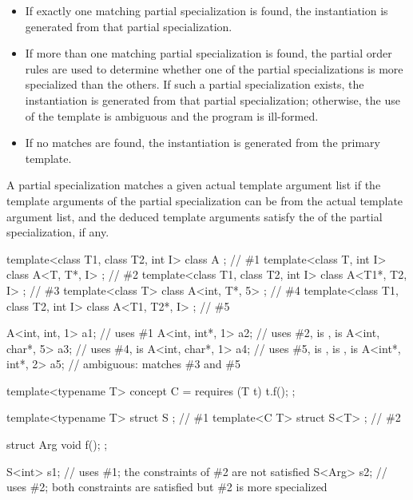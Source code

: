 \begin{itemize}
\item
If exactly one matching partial specialization is found, the instantiation is
generated from that partial specialization.
\item
If more than one matching partial specialization is found,
the partial order rules are used to determine
whether one of the partial specializations is more specialized than the
others.
If such a partial specialization exists,
the instantiation is generated from that partial specialization;
otherwise, the use of the template is ambiguous and the program is ill-formed.
\item
If no matches are found, the instantiation is generated from the
primary template.
\end{itemize}

\pnum
A partial specialization matches a given actual template argument
list if the template arguments of the partial specialization can be
 from the actual template argument list,
and the deduced template arguments satisfy the 
of the partial specialization, if any.
\begin{example}
\begin{codeblock}
template<class T1, class T2, int I> class A             { };    // \#1
template<class T, int I>            class A<T, T*, I>   { };    // \#2
template<class T1, class T2, int I> class A<T1*, T2, I> { };    // \#3
template<class T>                   class A<int, T*, 5> { };    // \#4
template<class T1, class T2, int I> class A<T1, T2*, I> { };    // \#5

A<int, int, 1>   a1;                    // uses \#1
A<int, int*, 1>  a2;                    // uses \#2,  is ,  is 
A<int, char*, 5> a3;                    // uses \#4,  is 
A<int, char*, 1> a4;                    // uses \#5,  is ,  is ,  is 
A<int*, int*, 2> a5;                    // ambiguous: matches \#3 and \#5
\end{codeblock}
\end{example}
\begin{example}
\begin{codeblock}
template<typename T> concept C = requires (T t) { t.f(); };

template<typename T> struct S { };      // \#1
template<C T> struct S<T> { };          // \#2

struct Arg { void f(); };

S<int> s1;                              // uses \#1; the constraints of \#2 are not satisfied
S<Arg> s2;                              // uses \#2; both constraints are satisfied but \#2 is more specialized
\end{codeblock}
\end{example}

